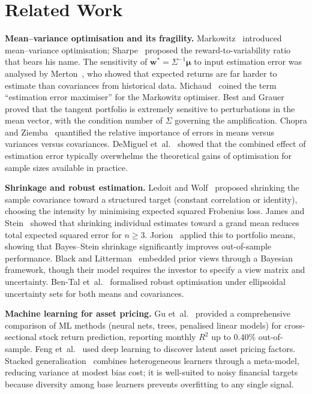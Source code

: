 \documentclass[10pt,twocolumn]{article}
\newcommand{\bw}{\bm{w}}
\newcommand{\bmu}{\bm{\mu}}
\begin{document}
\section{Related Work}\label{sec:lit}

\textbf{Mean--variance optimisation and its fragility.}
Markowitz~\cite{markowitz1952} introduced mean--variance
optimisation; Sharpe~\cite{sharpe1966} proposed the reward-to-variability
ratio that bears his name.  The sensitivity of
$\bw^*=\Sigma^{-1}\bmu$ to input estimation error was analysed
by Merton~\cite{merton1980}, who showed that expected returns are
far harder to estimate than covariances from historical data.
Michaud~\cite{michaud1989} coined the term ``estimation error
maximiser'' for the Markowitz optimiser.  Best and
Grauer~\cite{best1991} proved that the tangent portfolio is
extremely sensitive to perturbations in the mean vector, with
the condition number of $\Sigma$ governing the amplification.
Chopra and Ziemba~\cite{chopra1993} quantified the relative
importance of errors in means versus variances versus covariances.
DeMiguel et~al.~\cite{demiguel2009} showed that the combined effect
of estimation error typically overwhelms the theoretical gains of
optimisation for sample sizes available in practice.

\textbf{Shrinkage and robust estimation.}
Ledoit and Wolf~\cite{ledoit2004} proposed shrinking the sample
covariance toward a structured target (constant correlation or
identity), choosing the intensity by minimising expected squared
Frobenius loss.  James and Stein~\cite{james1961} showed that
shrinking individual estimates toward a grand mean reduces total
expected squared error for $n\ge 3$.  Jorion~\cite{jorion1986}
applied this to portfolio means, showing that Bayes--Stein
shrinkage significantly improves out-of-sample performance.
Black and Litterman~\cite{black1992} embedded prior views through
a Bayesian framework, though their model requires the investor to
specify a view matrix and uncertainty.  Ben-Tal
et~al.~\cite{bental2009} formalised robust optimisation under
ellipsoidal uncertainty sets for both means and covariances.

\textbf{Machine learning for asset pricing.}
Gu et~al.~\cite{gu2020empirical} provided a comprehensive
comparison of ML methods (neural nets, trees, penalised linear
models) for cross-sectional stock return prediction, reporting
monthly $R^2$ up to 0.40\% out-of-sample.  Feng
et~al.~\cite{feng2020taming} used deep learning to discover
latent asset pricing factors.  Stacked
generalisation~\cite{wolpert1992,breiman1996} combines
heterogeneous learners through a meta-model, reducing variance at
modest bias cost; it is well-suited to noisy financial targets
because diversity among base learners prevents overfitting to any
single signal.
\end{document}
